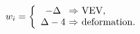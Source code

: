 \begin{equation}
w_i= \left\{ \begin{array}{c@{~\Rightarrow~}l} 
- \Delta & {\rm VEV,} \\
\Delta -4 & {\rm deformation.} 
\end{array}
\right. 
\end{equation}

